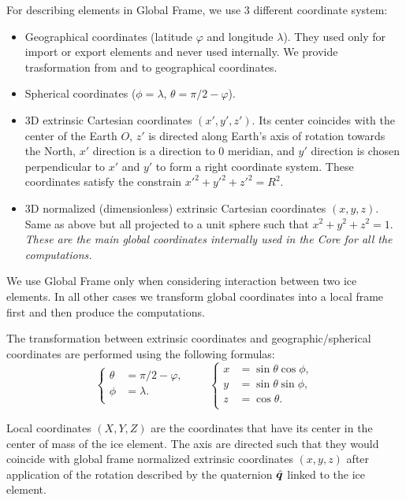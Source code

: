 For describing elements in Global Frame, we use 3 different coordinate
system:
\begin{itemize}
\item Geographical coordinates (latitude $\varphi$ and longitude
  $\lambda$). They used only for import or export elements and never
  used internally. We provide trasformation from and to geographical
  coordinates.
\item Spherical coordinates ($\phi=\lambda$, $\theta=\pi/2-\varphi$).
\item 3D extrinsic Cartesian coordinates $(x',y',z')$.  Its center
  coincides with the center of the Earth $O$, $z'$ is directed along
  Earth's axis of rotation towards the North, $x'$ direction is a
  direction to 0 meridian, and $y'$ direction is chosen perpendicular
  to $x'$ and $y'$ to form a right coordinate system. These
  coordinates satisfy the constrain ${x'}^2+{y'}^2+{z'}^2=R^2$.
\item 3D normalized (dimensionless) extrinsic Cartesian coordinates
  $(x,y,z)$. Same as above but all projected to a unit sphere such
  that ${x}^2+{y}^2+{z}^2=1$.  \textit{These are the main global coordinates
  internally used in the Core for all the computations.}
\end{itemize}

We use Global Frame only when considering interaction between two ice
elements. In all other cases we transform global coordinates into a
local frame first and then produce the computations.

The transformation between extrinsic coordinates and
geographic/spherical coordinates are performed using the following
formulas:
\begin{equation}\label{eq:extrinsic}
  \left\{
  \begin{aligned}
    \theta &= \pi/2 - \varphi,\\
    \phi &=\lambda.\\
  \end{aligned}
  \right.\qquad\left\{
  \begin{aligned}
    x &= \sin\theta\cos\phi, \\
    y &= \sin\theta\sin\phi, \\
    z &= \cos\theta.\\
  \end{aligned}
  \right.
\end{equation}

Local coordinates $(X,Y,Z)$ are the coordinates that have its center
in the center of mass of the ice element. The axis are directed such
that they would coincide with global frame normalized extrinsic
coordinates $(x,y,z)$ after application of the rotation described by
the quaternion ${\hat{\bm{q}}}$ linked to the ice element.

